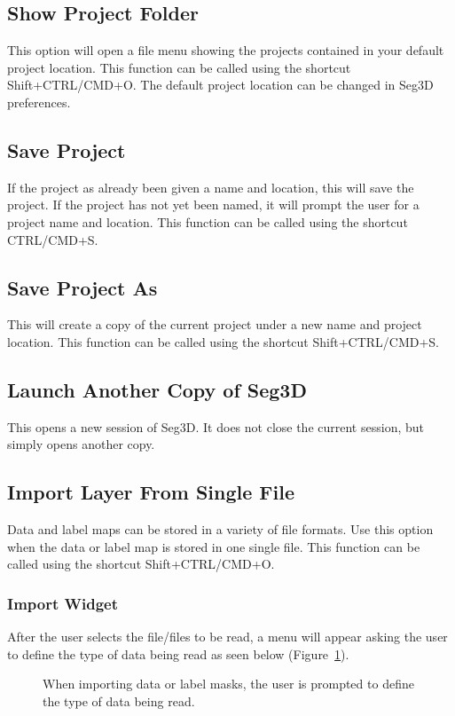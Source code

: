 \documentclass[fleqn,11pt,openany]{book}
\begin{document}
\subsection{Show Project Folder}
This option will open a file menu showing the projects contained in your default project location.  This function can be called using the shortcut Shift+CTRL/CMD+O.  The default project location can be changed in Seg3D preferences.

\subsection{Save Project}
If the project as already been given a name and location, this will save the project.  If the project has not yet been named, it will prompt the user for a project name and location.  This function can be called using the shortcut CTRL/CMD+S.

\subsection{Save Project As}
\label{sec:saveprojectas}
This will create a copy of the current project under a new name and project location.  This function can be called using the shortcut Shift+CTRL/CMD+S.

\subsection{Launch Another Copy of Seg3D}
This opens a new session of Seg3D.  It does not close the current session, but simply opens another copy.

\subsection{Import Layer From Single File}
\label{sec:importsinglefile}
Data and label maps can be stored in a variety of file formats.  Use this option when the data or label map is stored in one single file.  This function can be called using the shortcut Shift+CTRL/CMD+O.

\subsubsection{Import Widget}
After the user selects the file/files to be read, a menu will appear asking the user to define the type of data being read as seen below (Figure~\ref{fig:ImportWidget}).

\begin{figure}[h!]
\caption{When importing data or label masks, the user is prompted to define the type of data being read.}\label{fig:ImportWidget}
\end{figure}
\end{document}
